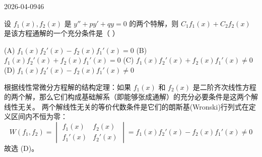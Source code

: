 \begin{mistake}{2026-04-09}{46}

\begin{problemcontent}
设 \( f_1(x), f_2(x) \) 是 \( y'' + py' + qy = 0 \) 的两个特解，则 \( C_1 f_1(x) + C_2 f_2(x) \) 是该方程通解的一个充分条件是（ ）

(A) \( f_1(x) f_2'(x) - f_2(x) f_1'(x) = 0 \)
(B) \( f_1(x) f_2'(x) + f_2(x) f_1'(x) = 0 \)
(C) \( f_1(x) f_2'(x) + f_2(x) f_1'(x) \neq 0 \)
(D) \( f_1(x) f_2'(x) - f_2(x) f_1'(x) \neq 0 \)
\end{problemcontent}

\begin{solutioncontent}
根据线性常微分方程解的结构定理：如果 \( f_1(x) \) 和 \( f_2(x) \) 是二阶齐次线性方程的两个解，那么它们构成基础解系（即能够张成通解）的充分必要条件是这两个解线性无关。
两个解线性无关的等价代数条件是它们的朗斯基(Wronski)行列式在定义区间内不恒为零：
\[
W(f_1, f_2) = \begin{vmatrix} f_1(x) & f_2(x) \\ f_1'(x) & f_2'(x) \end{vmatrix} = f_1(x) f_2'(x) - f_2(x) f_1'(x) \neq 0
\]
故选 (D)。
\end{solutioncontent}


\end{mistake}
